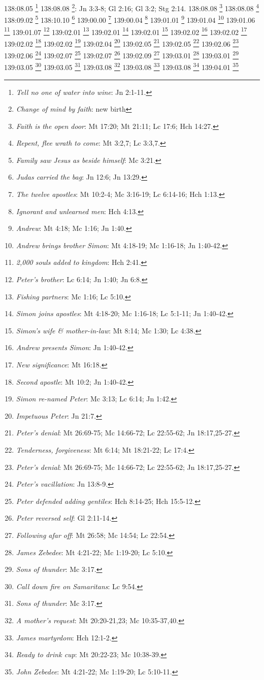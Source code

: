 {{{{{{{{{{{{{{{{{{{{{{{{{{{{{{{{{{138:08.05 \footnote{\textit{Tell no one of water into wine}: Jn 2:1-11.}
138:08.08 \footnote{\textit{Change of mind by faith}: new birth}: Jn 3:3-8; Gl 2:16; Gl 3:2; Stg 2:14.}
138:08.08 \footnote{\textit{Faith is the open door}: Mt 17:20; Mt 21:11; Lc 17:6; Hch 14:27.}
138:08.08 \footnote{\textit{Repent, flee wrath to come}: Mt 3:2,7; Lc 3:3,7.}
138:09.02 \footnote{\textit{Family saw Jesus as beside himself}: Mc 3:21.}
138:10.10 \footnote{\textit{Judas carried the bag}: Jn 12:6; Jn 13:29.}
139:00.00 \footnote{\textit{The twelve apostles}: Mt 10:2-4; Mc 3:16-19; Lc 6:14-16; Hch 1:13.}
139:00.04 \footnote{\textit{Ignorant and unlearned men}: Hch 4:13.}
139:01.01 \footnote{\textit{Andrew}: Mt 4:18; Mc 1:16; Jn 1:40.}
139:01.04 \footnote{\textit{Andrew brings brother Simon}: Mt 4:18-19; Mc 1:16-18; Jn 1:40-42.}
139:01.06 \footnote{\textit{2,000 souls added to kingdom}: Hch 2:41.}
139:01.07 \footnote{\textit{Peter's brother}: Lc 6:14; Jn 1:40; Jn 6:8.}
139:02.01 \footnote{\textit{Fishing partners}: Mc 1:16; Lc 5:10.}
139:02.01 \footnote{\textit{Simon joins apostles}: Mt 4:18-20; Mc 1:16-18; Lc 5:1-11; Jn 1:40-42.}
139:02.01 \footnote{\textit{Simon's wife & mother-in-law}: Mt 8:14; Mc 1:30; Lc 4:38.}
139:02.02 \footnote{\textit{Andrew presents Simon}: Jn 1:40-42.}
139:02.02 \footnote{\textit{New significance}: Mt 16:18.}
139:02.02 \footnote{\textit{Second apostle}: Mt 10:2; Jn 1:40-42.}
139:02.02 \footnote{\textit{Simon re-named Peter}: Mc 3:13; Lc 6:14; Jn 1:42.}
139:02.04 \footnote{\textit{Impetuous Peter}: Jn 21:7.}
139:02.05 \footnote{\textit{Peter's denial}: Mt 26:69-75; Mc 14:66-72; Lc 22:55-62; Jn 18:17,25-27.}
139:02.05 \footnote{\textit{Tenderness, forgiveness}: Mt 6:14; Mt 18:21-22; Lc 17:4.}
139:02.06 \footnote{\textit{Peter's denial}: Mt 26:69-75; Mc 14:66-72; Lc 22:55-62; Jn 18:17,25-27.}
139:02.06 \footnote{\textit{Peter's vacillation}: Jn 13:8-9.}
139:02.07 \footnote{\textit{Peter defended adding gentiles}: Hch 8:14-25; Hch 15:5-12.}
139:02.07 \footnote{\textit{Peter reversed self}: Gl 2:11-14.}
139:02.09 \footnote{\textit{Following afar off}: Mt 26:58; Mc 14:54; Lc 22:54.}
139:03.01 \footnote{\textit{James Zebedee}: Mt 4:21-22; Mc 1:19-20; Lc 5:10.}
139:03.01 \footnote{\textit{Sons of thunder}: Mc 3:17.}
139:03.05 \footnote{\textit{Call down fire on Samaritans}: Lc 9:54.}
139:03.05 \footnote{\textit{Sons of thunder}: Mc 3:17.}
139:03.08 \footnote{\textit{A mother's request}: Mt 20:20-21,23; Mc 10:35-37,40.}
139:03.08 \footnote{\textit{James martyrdom}: Hch 12:1-2.}
139:03.08 \footnote{\textit{Ready to drink cup}: Mt 20:22-23; Mc 10:38-39.}
139:04.01 \footnote{\textit{John Zebedee}: Mt 4:21-22; Mc 1:19-20; Lc 5:10-11.}
}}}}}}}}}}}}}}}}}}}}}}}}}}}}}}}}}
